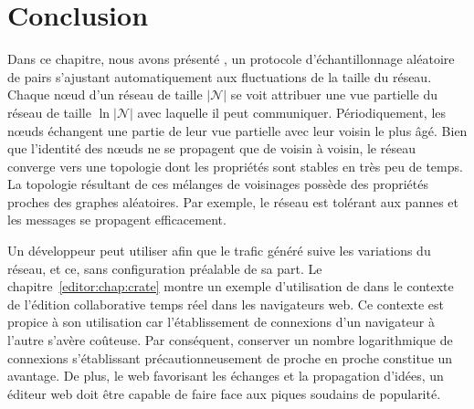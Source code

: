 
\section{Conclusion}
\label{net:sec:conclusion}

Dans ce chapitre, nous avons présenté \SPRAY, un protocole d'échantillonnage
aléatoire de pairs s'ajustant automatiquement aux fluctuations de la taille du
réseau. Chaque nœud d'un réseau de taille $|\mathcal{N}|$ se voit attribuer une
vue partielle du réseau de taille $\ln |\mathcal{N}|$ avec laquelle il peut
communiquer. Périodiquement, les nœuds échangent une partie de leur vue
partielle avec leur voisin le plus âgé. Bien que l'identité des nœuds ne se
propagent que de voisin à voisin, le réseau converge vers une topologie dont les
propriétés sont stables en très peu de temps. La topologie résultant de ces
mélanges de voisinages possède des propriétés proches des graphes
aléatoires. Par exemple, le réseau est tolérant aux pannes et les messages se
propagent efficacement.

Un développeur peut utiliser \SPRAY afin que le trafic généré suive les
variations du réseau, et ce, sans configuration préalable de sa part. Le
chapitre~\ref{editor:chap:crate} montre un exemple d'utilisation de \SPRAY dans
le contexte de l'édition collaborative temps réel dans les navigateurs web.  Ce
contexte est propice à son utilisation car l'établissement de connexions d'un
navigateur à l'autre s'avère coûteuse. Par conséquent, conserver un nombre
logarithmique de connexions s'établissant précautionneusement de proche en
proche constitue un avantage. De plus, le web favorisant les échanges et la
propagation d'idées, un éditeur web doit être capable de faire face aux piques
soudains de popularité. 

